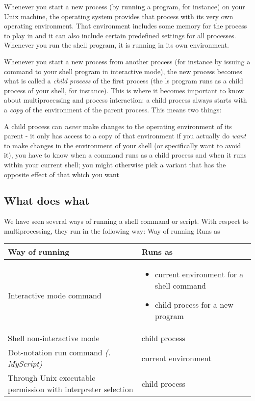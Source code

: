 Whenever you start a new process (by running a program, for instance) on your
Unix machine, the operating system provides that process with its very own
operating environment. That environment includes some memory for the process to
play in and it can also include certain predefined settings for all processes.
Whenever you run the shell program, it is running in its own environment.

Whenever you start a new process from another process (for instance by issuing
a command to your shell program in interactive mode), the new process becomes
what is called a \textit{child process} of the first process (the ls program
runs as a child process of your shell, for instance). This is where it becomes
important to know about multiprocessing and process interaction: a child
process always starts with a \textit{copy} of the environment of the parent
process. This means two things:

A child process can \textit{never} make changes to the operating environment
of its parent - it only has access to a copy of that environment if you
actually do \textit{want} to make changes in the environment of your shell (or
specifically want to avoid it), you have to know when a command runs as a child
process and when it runs within your current shell; you might otherwise pick a
variant that has the opposite effect of that which you want

\subsection{What does what}
We have seen several ways of running a shell command or script. With respect to
multiprocessing, they run in the following way:
Way of running Runs as

\begin{tabular}{|p{4cm}|p{4cm}|}
\hline
Way of running & Runs as\\ \hline
Interactive mode command & \begin{itemize}
\item current environment for a shell command
\item child process for a new program
\end{itemize} \\ \hline
Shell non-interactive mode &child process\\ \hline
Dot-notation run command \textit{(. MyScript)} & current environment\\ \hline
Through Unix executable permission with interpreter selection & child process\\
\hline
\end{tabular}

